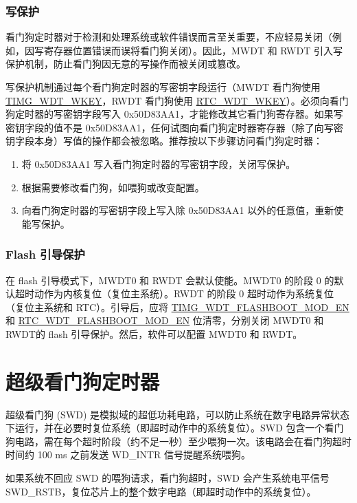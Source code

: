 \documentclass[main\_\_CN.tex]{subfiles}
\begin{document}
\subsubsection{写保护}
看门狗定时器对于检测和处理系统或软件错误而言至关重要，不应轻易关闭（例如，因写寄存器位置错误而误将看门狗关闭）。因此，MWDT 和 RWDT 引入写保护机制，防止看门狗因无意的写操作而被关闭或篡改。

写保护机制通过每个看门狗定时器的写密钥字段运行（MWDT 看门狗使用 \hyperref[fielddesc:TIMGWDTWKEY]{TIMG\_WDT\_WKEY}，RWDT 看门狗使用 \hyperref[fielddesc:RTCWDTWKEY]{RTC\_WDT\_WKEY}）。必须向看门狗定时器的写密钥字段写入 0x50D83AA1，才能修改其它看门狗寄存器。如果写密钥字段的值不是 0x50D83AA1，任何试图向看门狗定时器寄存器（除了向写密钥字段本身）写值的操作都会被忽略。推荐按以下步骤访问看门狗定时器：

\begin{enumerate}
\item 将 0x50D83AA1 写入看门狗定时器的写密钥字段，关闭写保护。
\item 根据需要修改看门狗，如喂狗或改变配置。
\item 向看门狗定时器的写密钥字段上写入除 0x50D83AA1 以外的任意值，重新使能写保护。
\end{enumerate}

\subsubsection{Flash 引导保护}
在 flash 引导模式下，MWDT0 和 RWDT 会默认使能。MWDT0 的阶段 0 的默认超时动作为内核复位（复位主系统）。RWDT 的阶段 0 超时动作为系统复位（复位主系统和 RTC）。引导后，应将 \hyperref[fielddesc:TIMGWDTFLASHBOOTMODEN]{TIMG\_WDT\_FLASHBOOT\_MOD\_EN} 和 \hyperref[fielddesc:RTCWDTFLASHBOOTMODEN]{RTC\_WDT\_FLASHBOOT\_MOD\_EN} 位清零，分别关闭 MWDT0 和 RWDT的 flash 引导保护。然后，软件可以配置 MWDT0 和 RWDT。


\section{超级看门狗定时器}\label{sec:wdt-swdt}
超级看门狗 (SWD) 是模拟域的超低功耗电路，可以防止系统在数字电路异常状态下运行，并在必要时复位系统（即超时动作中的系统复位）。SWD 包含一个看门狗电路，需在每个超时阶段（约不足一秒）至少喂狗一次。该电路会在看门狗超时时间约 100 ms 之前发送 WD\_INTR 信号提醒系统喂狗。

如果系统不回应 SWD 的喂狗请求，看门狗超时，SWD 会产生系统电平信号 SWD\_RSTB，复位芯片上的整个数字电路（即超时动作中的系统复位）。
\end{document}

